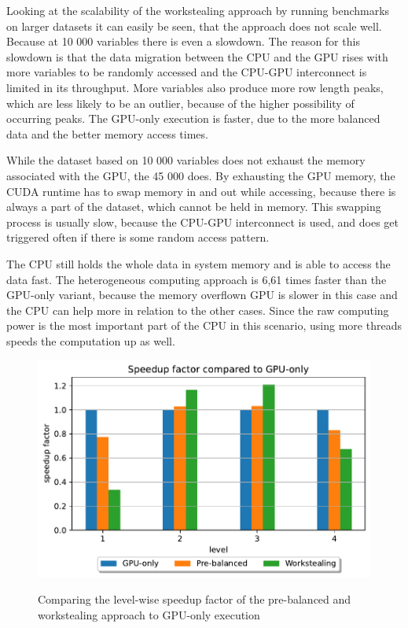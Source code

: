 Looking at the scalability of the workstealing approach by running benchmarks on larger datasets it can easily be seen, that the approach does not scale well. Because at 10 000 variables there is even a slowdown. The reason for this slowdown is that the data migration between the CPU and the GPU rises with more variables to be randomly accessed and the CPU-GPU interconnect is limited in its throughput. More variables also produce more row length peaks, which are less likely to be an outlier, because of the higher possibility of occurring peaks.
The GPU-only execution is faster, due to the more balanced data and the better memory access times.

While the dataset based on 10 000 variables does not exhaust the memory associated with the GPU, the 45 000 does. By exhausting the GPU memory, the CUDA runtime has to swap memory in and out while accessing, because there is always a part of the dataset, which cannot be held in memory. This swapping process is usually slow, because the CPU-GPU interconnect is used, and does get triggered often if there is some random access pattern.

The CPU still holds the whole data in system memory and is able to access the data fast. The heterogeneous computing approach is 6,61 times faster than the GPU-only variant, because the memory overflown GPU is slower in this case and the CPU can help more in relation to the other cases.
Since the raw computing power is the most important part of the CPU in this scenario, using more threads speeds the computation up as well.

\begin{figure}[H]
  \caption{Comparing the level-wise speedup factor of the pre-balanced and workstealing approach to GPU-only execution}
  \includegraphics[width=\textwidth]{figures/levelwise.pdf}
  \centering
  \label{fig:levelwise_delos}
\end{figure}


